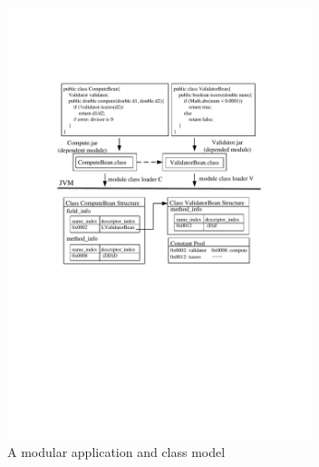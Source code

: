 \documentclass[conference]{IEEEtran}
\begin{document}

\begin{figure}[ht]
\centering
\includegraphics[width=3.5in]{ExampleEJBJVM.pdf}
\caption{A modular application and class model}
\label{fig:example_ejb_jvm}
\end{figure}
\end{document}
